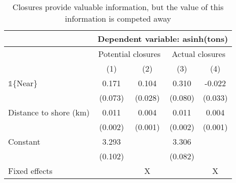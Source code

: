 \begin{table}[tb]
\centering
\caption{Closures provide valuable information, but the value of this information is competed away} 
\label{information_valuable}
\begin{tabular}{lcccc}
   \toprule & \multicolumn{4}{c}{Dependent variable: asinh(tons)} \\  \midrule & \multicolumn{2}{c}{Potential closures} & \multicolumn{2}{c}{Actual closures} \\ & (1) & (2) & (3) & (4) \\ 
   \midrule $\mathbb{1}$\{Near\} & 0.171 & 0.104 & 0.310 & -0.022 \\ 
   & (0.073) & (0.028) & (0.080) & (0.033) \\ 
  Distance to shore (km) & 0.011 & 0.004 & 0.011 & 0.004 \\ 
   & (0.002) & (0.001) & (0.002) & (0.001) \\ 
  Constant & 3.293 &  & 3.306 &  \\ 
   & (0.102) &  & (0.082) &  \\ 
   \midrule Fixed effects & & X & & X\\  \bottomrule \end{tabular}
\end{table}
